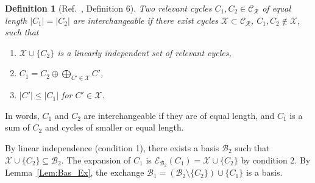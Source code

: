 \documentclass[fleqn,11pt]{article}
\newtheorem{definition}{Definition}
\newcommand\calB{\mathcal{B}}
\newcommand\calX{\mathcal{X}}     %
\newcommand\RelCyc{\mathcal{C_R}} %
\newcommand\expand[2]{\mathcal{E}_{#1}\left(#2\right)}   %
\begin{document}


\begin{definition}[Ref.~\cite{gleissInterchangeability2000}, Definition 6]
	Two relevant cycles $C_1,C_2\in\RelCyc$ of equal length $|C_1|=|C_2|$ are \emph{interchangeable} if there exist cycles $\calX\subset\RelCyc$, $C_1,C_2\notin\calX$, such that
	\begin{enumerate}
		\item $\calX\cup\{C_2\}$ is a linearly independent set of relevant cycles,
		\item $C_1=C_2\oplus \bigoplus_{C'\in\calX} C'$,
		\item $|C'|\le |C_1|$ for $C'\in\calX$.
	\end{enumerate}
	\label{def:intchg}
\end{definition}

In words, $C_1$ and $C_2$ are interchangeable if they are of equal length, and $C_1$ is a sum of $C_2$ and cycles of smaller or equal length.

By linear independence (condition 1), there exists a basis $\calB_2$ such that $\calX\cup\{C_2\}\subseteq\calB_2$. 
The expansion of $C_1$ is $\expand{\calB_2}{C_1} = \calX\cup\{C_2\}$ by condition 2.
By Lemma~\ref{Lem:Bas_Ex}, the exchange $\calB_1=(\calB_2\setminus\{C_2\})\cup\{C_1\}$ is a basis.
\end{document}
